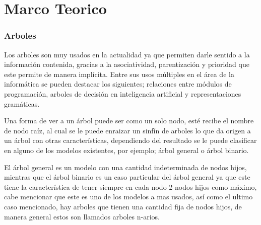\chapter{ Marco Teorico \label{cap2}}
\subsection{Arboles}

Los arboles son muy usados en la actualidad ya que permiten  darle sentido a la
 información contenida, gracias a la asociatividad, parentización y prioridad
 que este permite de manera implícita. Entre sus usos múltiples en el área de
 la informática se pueden destacar los  siguientes; relaciones entre módulos de
 programación, arboles de decisión en inteligencia artificial y representaciones
 gramáticas\cite{gutierrez1999estructuras}.  

Una forma de ver a un árbol puede ser como un solo nodo, esté recibe el nombre
 de  nodo raíz, al cual se le puede enraizar un sinfín de arboles lo que da
 origen  a un árbol con otras características, dependiendo del resultado se le
 puede clasificar en alguno de los modelos existentes, por ejemplo; árbol 
 general o árbol binario\cite{gutierrez1999estructuras}. 

El árbol general es un modelo con una cantidad indeterminada de nodos hijos,
 mientras que el árbol binario es un caso particular del árbol general ya que
 este tiene la característica de tener siempre en cada nodo 2 nodos hijos como
 máximo, cabe mencionar que este es uno de los modelos a mas usados, así como
 el ultimo caso mencionado, hay arboles que tienen una cantidad fija de nodos
 hijos, de manera general estos son llamados arboles n-arios\cite{gutierrez1999estructuras}.